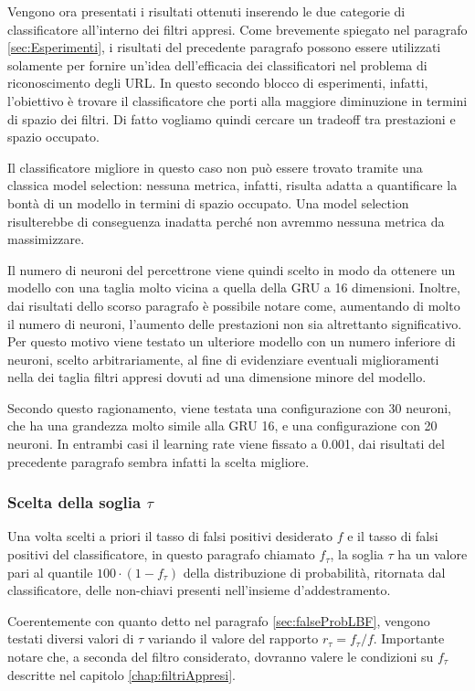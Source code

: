 \documentclass[../../main.tex]{subfiles}
\begin{document}
    Vengono ora presentati i risultati ottenuti inserendo le due categorie di classificatore all'interno dei filtri appresi. Come brevemente spiegato nel paragrafo \ref{sec:Esperimenti}, i risultati del precedente paragrafo possono essere utilizzati solamente per fornire un'idea dell'efficacia dei classificatori nel problema di riconoscimento degli URL. In questo secondo blocco di esperimenti, infatti, l'obiettivo è trovare il classificatore che porti alla maggiore diminuzione in termini di spazio dei filtri. Di fatto vogliamo quindi cercare un tradeoff tra prestazioni e spazio occupato.

    Il classificatore migliore in questo caso non può essere trovato tramite una classica model selection: nessuna metrica, infatti, risulta adatta a quantificare la bontà di un modello in termini di spazio occupato. Una model selection risulterebbe di conseguenza inadatta perché non avremmo nessuna metrica da massimizzare.

    Il numero di neuroni del percettrone viene quindi scelto in modo da ottenere un modello con una taglia molto vicina a quella della GRU a 16 dimensioni. Inoltre, dai risultati dello scorso paragrafo è possibile notare come, aumentando di molto il numero di neuroni, l'aumento delle prestazioni non sia altrettanto significativo. Per questo motivo viene testato un ulteriore modello con un numero inferiore di neuroni, scelto arbitrariamente, al fine di evidenziare eventuali miglioramenti nella dei taglia filtri appresi dovuti ad una dimensione minore del modello.

    Secondo questo ragionamento, viene testata una configurazione con 30 neuroni, che ha una grandezza molto simile alla GRU 16, e una configurazione con 20 neuroni. In entrambi casi il learning rate viene fissato a 0.001, dai risultati del precedente paragrafo sembra infatti la scelta migliore.
    
    \subsubsection{Scelta della soglia $\tau$}
    Una volta scelti a priori il tasso di falsi positivi desiderato $f$ e il tasso di falsi positivi del classificatore, in questo paragrafo chiamato $f_{\tau}$, la soglia $\tau$ ha un valore pari al quantile $100 \cdot (1 - f_{\tau})$ della distribuzione di probabilità, ritornata dal classificatore, delle non-chiavi presenti nell'insieme d'addestramento.

    Coerentemente con quanto detto nel paragrafo \ref{sec:falseProbLBF}, vengono testati diversi valori di $\tau$ variando il valore del rapporto $r_{\tau} = f_{\tau}/f$. Importante notare che, a seconda  del filtro considerato, dovranno valere le condizioni su $f_{\tau}$ descritte nel capitolo \ref{chap:filtriAppresi}.
\end{document}
